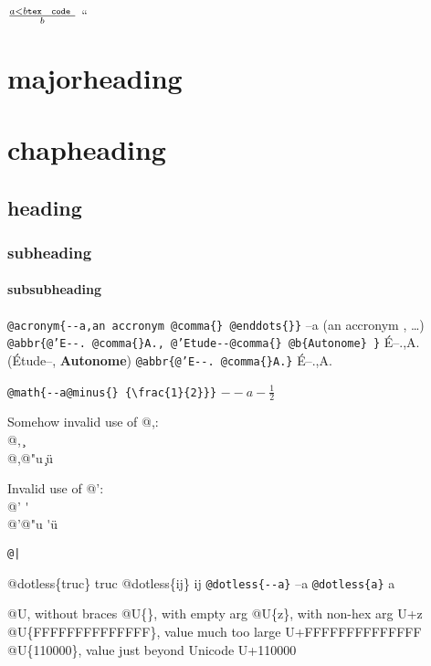 \documentclass{book}
\newcommand{\Texinfoplaceholder}[1]{}
\newcommand{\Texinfonopagebreakheading}[2]{{\let\clearpage\relax \let\cleardoublepage\relax \let\thispagestyle\Texinfoplaceholder #1{#2}}}
\renewcommand{\_}{\Texinfounderscore\discretionary{}{}{}}
\begin{document}
\begin{titlepage}
$\frac{a < b \texttt{tex \hbox{ code }}}{b}$ ``

\Texinfonopagebreakheading{\chapter*}{{majorheading}}

\Texinfonopagebreakheading{\chapter*}{{chapheading}}

\section*{{heading}}

\subsection*{{subheading}}

\subsubsection*{{subsubheading}}


\texttt{@acronym\{{-}{-}a,an accronym @comma\{\}\ @enddots\{\}\}} --a (an accronym , \dots{})
\texttt{@abbr\{@'E{-}{-}.\ @comma\{\}A.,\ @'Etude{-}{-}@comma\{\}\ @b\{Autonome\}\ \}} \'{E}--.\@ ,A.\@ (\'{E}tude--, \textbf{Autonome})
\texttt{@abbr\{@'E{-}{-}.\ @comma\{\}A.\}} \'{E}--.\@ ,A.\@

\texttt{@math\{{-}{-}a@minus\{\}\ \{\textbackslash{}frac\{1\}\{2\}\}\}} $--a- {\frac{1}{2}}$




Somehow invalid use of @,:\leavevmode{}\\
@, \c{}\leavevmode{}\\
@,@"u \c{}\"{u}

Invalid use of @':\leavevmode{}\\
@' \'{}\leavevmode{}\\
@'@"u \'{}\"{u}

\texttt{@|} 

@dotless\{truc\} truc
@dotless\{ij\} ij
\texttt{@dotless\{{-}{-}a\}} --a
\texttt{@dotless\{a\}} a

@U, without braces @U\{\}, with empty arg 
@U\{z\}, with non-hex arg U+z
@U\{FFFFFFFFFFFFFF\}, value much too large U+FFFFFFFFFFFFFF
@U\{110000\}, value just beyond Unicode U+110000


\end{titlepage}
\end{document}
